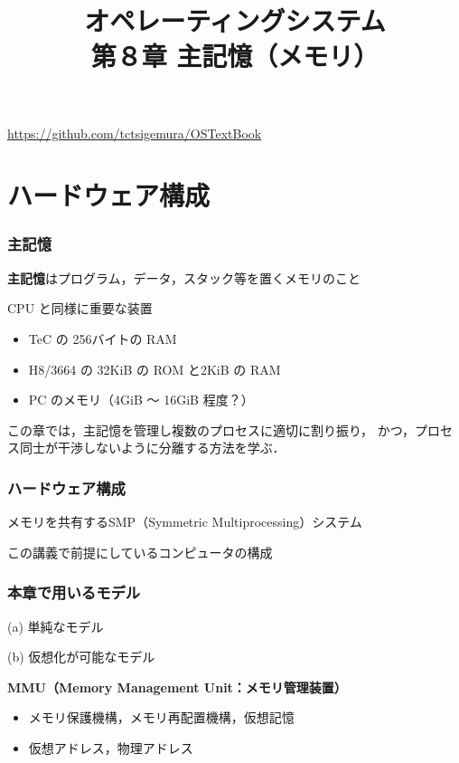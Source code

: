 \documentclass[unicode,handout]{beamer}                   %
\begin{document}
\title[主記憶]
      {オペレーティングシステム\\第８章 主記憶（メモリ）}
\date{}

\begin{frame}
  \titlepage
  \centerline{\url{https://github.com/tctsigemura/OSTextBook}}
\end{frame}


\section{ハードウェア構成}
\begin{frame}
  \frametitle{主記憶}

{\bf 主記憶}はプログラム，データ，スタック等を置くメモリのこと

CPU と同様に重要な装置

\begin{itemize}
\item TeC の 256バイトの RAM
\item H8/3664 の 32KiB の ROM と2KiB の RAM
\item PC のメモリ（4GiB 〜 16GiB 程度？）
\end{itemize}

この章では，主記憶を管理し複数のプロセスに適切に割り振り，
かつ，プロセス同士が干渉しないように分離する方法を学ぶ．
\end{frame}

\begin{frame}
  \frametitle{ハードウェア構成}
  メモリを共有するSMP（Symmetric Multiprocessing）システム
  \begin{center}
    この講義で前提にしているコンピュータの構成
  \end{center}
\end{frame}

\begin{frame}
  \frametitle{本章で用いるモデル}
  \begin{minipage}{0.49\columnwidth}
    \centerline{(a) 単純なモデル}
  \end{minipage}
  \begin{minipage}{0.49\columnwidth}
    \centerline{(b) 仮想化が可能なモデル}
  \end{minipage}
  \vfill
  {\bf MMU（Memory Management Unit：メモリ管理装置）}
  \begin{itemize}
  \item メモリ保護機構，メモリ再配置機構，仮想記憶
  \item 仮想アドレス，物理アドレス
  \end{itemize}
  \vfill
\end{frame}
\end{document}

